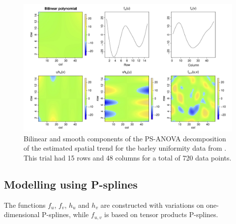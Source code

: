 \begin{figure}[hbtp]
\centering
\includegraphics[width=\textwidth]{../figures/bilinear_polynomial.PNG}
\caption[Bilinear and smooth components of the PS-ANOVA decomposition]{Bilinear and smooth components of the PS-ANOVA decomposition of the estimated spatial trend for the barley uniformity
data from \textcite{rodriguez-alvarez_correcting_2018}. This trial had 15 rows and 48 columns for a total of 720 data points.}
\label{fig:bilinear_and_smooth_decomposition}
\end{figure}


\subsection{Modelling using P-splines}
The functions $f_u$, $f_v$, $h_u$ and $h_v$ are constructed  with variations on one-dimensional P-splines, while $f_{u,v}$ is based on tensor products P-splines.\\

